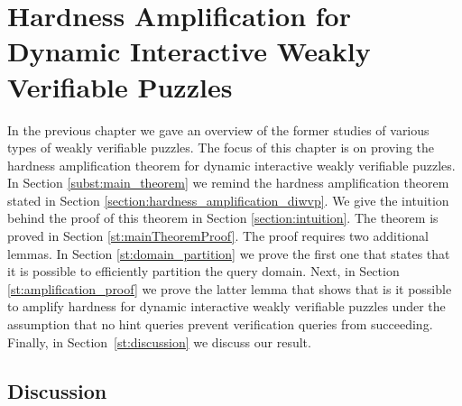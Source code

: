 \documentclass[11pt,a4paper,titlepage]{memoir}
\begin{document}
\chapter{Hardness Amplification for Dynamic Interactive Weakly Verifiable Puzzles}
\label{ch:main_result} %
In the previous chapter we gave an overview of the former studies of various types of weakly verifiable puzzles.
The focus of this chapter is on proving the hardness amplification theorem for dynamic interactive weakly verifiable puzzles.
In Section \ref{subst:main_theorem} we remind the hardness amplification theorem stated in Section \ref{section:hardness_amplification_diwvp}.
We give the intuition behind the proof of this theorem in Section \ref{section:intuition}.
The theorem is proved in Section \ref{st:mainTheoremProof}. The proof requires two additional lemmas.
In Section \ref{st:domain_partition} we prove the first one that states that it is possible to efficiently partition the query domain.
Next, in Section \ref{st:amplification_proof} we prove the latter lemma that shows that is it possible to amplify hardness for dynamic interactive weakly
verifiable puzzles under the assumption that no hint queries prevent verification queries from succeeding.
Finally, in Section~\ref{st:discussion} we discuss our result.
%





%
\section{Discussion}
\label{ch:discussion}

%
\appendix

%
\backmatter
%


%
\end{document}
